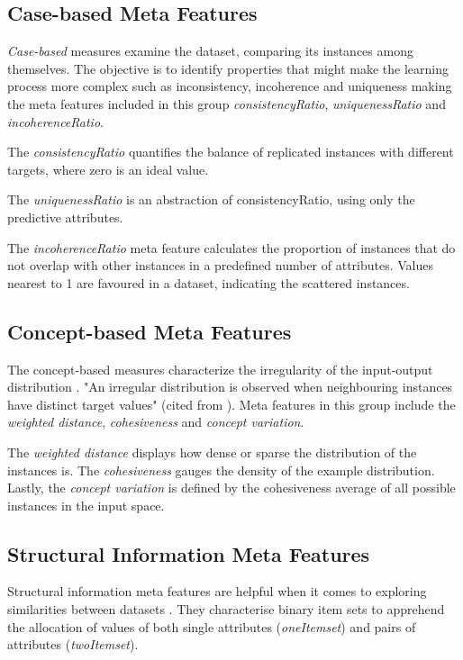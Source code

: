 \subsection{Case-based Meta Features}
\textit{Case-based} measures examine the dataset, comparing its instances among themselves. The objective is to identify properties that might make the learning process more complex \citep{kopf2002combination} such as inconsistency, incoherence and uniqueness making the meta features included in this group \textit{consistencyRatio}, \textit{uniquenessRatio} and \textit{incoherenceRatio}.

The \textit{consistencyRatio} quantifies the balance of replicated instances with different targets, where zero is an ideal value.

The \textit{uniquenessRatio} is an abstraction of consistencyRatio, using only the predictive attributes.

The \textit{incoherenceRatio} meta feature calculates the proportion of instances that do not overlap with other instances in a predefined number of attributes. Values nearest to 1 are favoured in a dataset, indicating the scattered instances.

\subsection{Concept-based Meta Features}
The concept-based measures characterize the irregularity of the input-output distribution \citep{perez1996learning}. "An irregular distribution is observed when neighbouring instances have distinct target values" (cited from \cite{munoz2018instance}). Meta features in this group include the \textit{weighted distance}, \textit{cohesiveness} and \textit{concept variation}.

The \textit{weighted distance} displays how dense or sparse the distribution of the instances is. The \textit{cohesiveness} gauges the density of the example distribution. Lastly, the \textit{concept variation} is defined by the cohesiveness average of all possible instances in the input space.

\subsection{Structural Information Meta Features}
Structural information meta features are helpful when it comes to exploring similarities between datasets \citep{wang2015improved}. They characterise binary item sets to apprehend the allocation of values of both single attributes (\textit{oneItemset}) and pairs of attributes (\textit{twoItemset}). 

